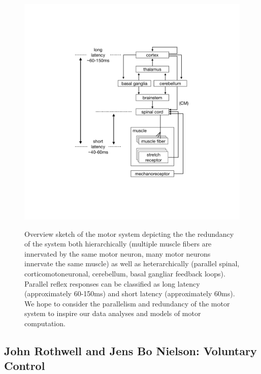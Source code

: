 \begin{figure}
\label{fig:motor_system}
\centering
\includegraphics[width=1\textwidth,height=\textheight]{images/physiology/motor_system/motor_system.pdf}
\caption{Overview sketch of the motor system depicting the the
redundancy of the system both hierarchically (multiple muscle fibers are
innervated by the same motor neuron, many motor neurons innervate the
same muscle) as well as heterarchically (parallel spinal,
corticomotoneuronal, cerebellum, basal gangliar feedback loops).
Parallel reflex responses can be classified as long latency
(approximately 60-150ms) and short latency (approximately 60ms). We hope
to consider the parallelism and redundancy of the motor system to
inspire our data analyses and models of motor
computation.}\label{fig:motor_system}
\end{figure}

\subsection{John Rothwell and Jens Bo Nielson: Voluntary
Control}\label{john-rothwell-and-jens-bo-nielson-voluntary-control}

